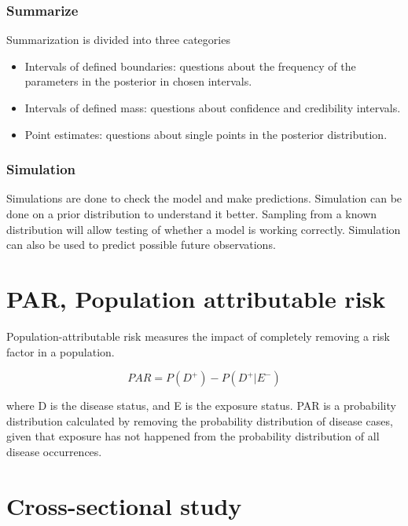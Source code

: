 \subsubsection*{Summarize}

Summarization is divided into three categories

\begin{itemize}
    \item Intervals of defined boundaries: questions about the frequency of the parameters in the posterior in chosen intervals.
    \item Intervals of defined mass: questions about confidence and credibility intervals. 
    \item Point estimates: questions about single points in the posterior distribution.
\end{itemize}

\subsubsection*{Simulation}

Simulations are done to check the model and make predictions. Simulation can be done on a prior distribution to understand it better. Sampling from a known distribution will allow testing of whether a model is working correctly. Simulation can also be used to predict possible future observations. \cite{Mcelreath2015StatisticalRA}

\section{PAR, Population attributable risk}\label{PAR}

Population-attributable risk measures the impact of completely removing a risk factor in a population.

\begin{equation} \label{PARequation}
PAR = P(D^+) - P(D^+| E^-)
\end{equation}

where D is the disease status, and E is the exposure status. PAR is a probability distribution calculated by removing the probability distribution of disease cases, given that exposure has not happened from the probability distribution of all disease occurrences. \cite{Pirikahu2016BayesianMO}

\section{Cross-sectional study}\label{CrossSectionalStudy}

